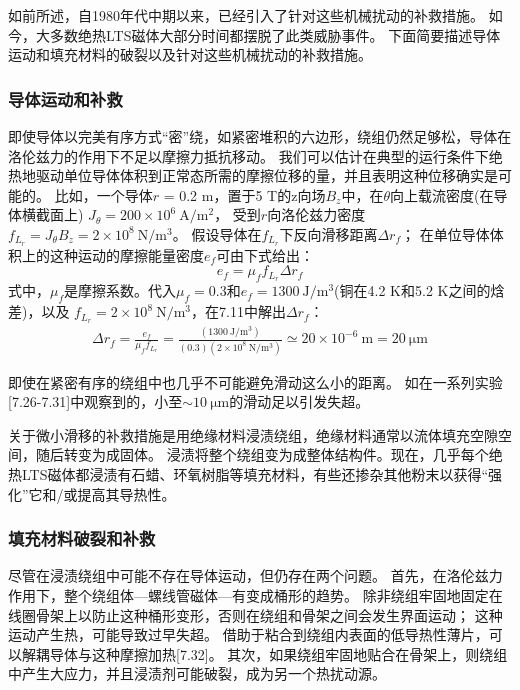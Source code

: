 如前所述，自1980年代中期以来，已经引入了针对这些机械扰动的补救措施。
如今，大多数绝热LTS磁体大部分时间都摆脱了此类威胁事件。
下面简要描述导体运动和填充材料的破裂以及针对这些机械扰动的补救措施。

\subsubsection*{导体运动和补救}
即使导体以完美有序方式“密”绕，如紧密堆积的六边形，绕组仍然足够松，导体在洛伦兹力的作用下不足以摩擦力抵抗移动。
我们可以估计在典型的运行条件下绝热地驱动单位导体体积到正常态所需的摩擦位移的量，并且表明这种位移确实是可能的。
比如，一个导体$r$ = 0.2 m，置于5 T的z向场$B_z$中，在$\theta$向上载流密度(在导体横截面上)
$J_\theta= 200\times 10^6\ \mathrm{A/m^2}$，
受到$r$向洛伦兹力密度$f_{L_r} =J_\theta B_z=2\times 10^8\ \mathrm{N/m^3}$。
假设导体在$f_{L_r}$下反向滑移距离$\Delta r_f$；
在单位导体体积上的这种运动的摩擦能量密度$e_f$可由下式给出：
\begin{equation}%
e_f=\mu_ff_{L_r}\Delta r_f
\end{equation}
式中，$\mu_f$是摩擦系数。代入$\mu_f=0.3$和$e_f=1300\ \mathrm{J/m^3}$(铜在4.2 K和5.2 K之间的焓差)，以及
$f_{L_r}=2\times 10^8\ \mathrm{N/m^3}$，在7.11中解出$\Delta r_f$：
\begin{align*}%
\Delta r_f=\frac{e_f}{\mu_ff_{L_r}}=\frac{(1300\ \mathrm{J/m^3})}{(0.3)(2\times 10^8\ \mathrm{N/m^3})}\simeq 20\times 10^{-6}\ \mathrm{m}=20\ \mathrm{\mu m}
\end{align*}

即使在紧密有序的绕组中也几乎不可能避免滑动这么小的距离。
如在一系列实验[7.26-7.31]中观察到的，小至$\sim 10\ \mathrm{\mu m}$的滑动足以引发失超。

关于微小滑移的补救措施是用绝缘材料浸渍绕组，绝缘材料通常以流体填充空隙空间，随后转变为成固体。
浸渍将整个绕组变为成整体结构件。现在，几乎每个绝热LTS磁体都浸渍有石蜡、环氧树脂等填充材料，有些还掺杂其他粉末以获得“强化”它和/或提高其导热性。
 
\subsubsection*{填充材料破裂和补救}
尽管在浸渍绕组中可能不存在导体运动，但仍存在两个问题。
首先，在洛伦兹力作用下，整个绕组体---螺线管磁体---有变成桶形的趋势。
除非绕组牢固地固定在线圈骨架上以防止这种桶形变形，否则在绕组和骨架之间会发生界面运动；
这种运动产生热，可能导致过早失超。
借助于粘合到绕组内表面的低导热性薄片，可以解耦导体与这种摩擦加热[7.32]。
其次，如果绕组牢固地贴合在骨架上，则绕组中产生大应力，并且浸渍剂可能破裂，成为另一个热扰动源。

